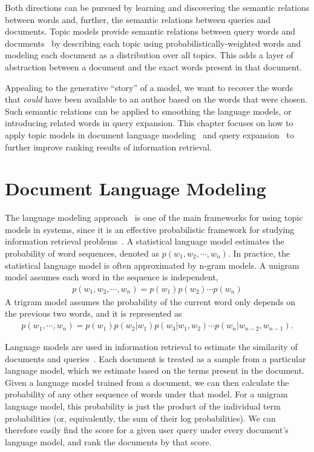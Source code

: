 Both directions can be pursued by learning and discovering the
semantic relations between words and, further, the semantic relations
between queries and documents. Topic models provide semantic relations between query words and
documents~\citep{deerwester-90,hofmann-99a} by describing each topic
using probabilistically-weighted words and modeling each document as a distribution over
all topics.
This adds a layer of abstraction between a document and the exact words present in that document.

Appealing to the generative ``story'' of a model, we want to recover the words that {\em could} have been available to an author based on the words that were chosen.
Such semantic relations
can be applied to smoothing the language models, or introducing
related words in query expansion. This chapter focuses on how to apply
topic models in document language modeling~\citep{Lu-2011,wei-06} and
query expansion~\citep{Park-2009,Andrzejewski-2011} to further improve
 ranking results of information retrieval.

\section{Document Language Modeling}
\label{sec:ir-lm}

The language modeling approach~\citep{PonteCroft,song-99,croft-03} is
one of the main frameworks for using topic models in  systems, since
it is an effective probabilistic framework for studying
information retrieval problems~\citep{PonteCroft,berger-99}.
A statistical language model estimates the probability of word
sequences, denoted as $p(w_1,w_2,\cdots,w_n)$. In practice, the
statistical language model is often approximated by n-gram models. A
unigram model assumes each word in the sequence is independent,
\begin{align}
p(w_1,w_2,\cdots,w_n) = p(w_1)p(w_2) \cdots p(w_n)
\end{align}
A trigram model assumes the probability of the current word only
depends on the previous two words, and it is represented as
\begin{align}
p(w_1,\cdots,w_n)=p(w_1)p(w_2|w_1)p(w_3|w_1,w_2)\cdots p(w_n|w_{n-2},w_{n-1}).
\end{align}

Language models are used in information retrieval to estimate the similarity of documents and queries~\citep{zhai-01}.
Each document is treated as a sample from a particular language model, which we estimate based on the terms present in the document.
Given a language model trained from a document, we can then calculate the probability of any other sequence of words under that model.
For a unigram language model, this probability is just the product of the individual term probabilities (or, equivalently, the sum of their log probabilities).
We can therefore easily find the score for a given user query under every document's language model, and rank the documents by that score.

